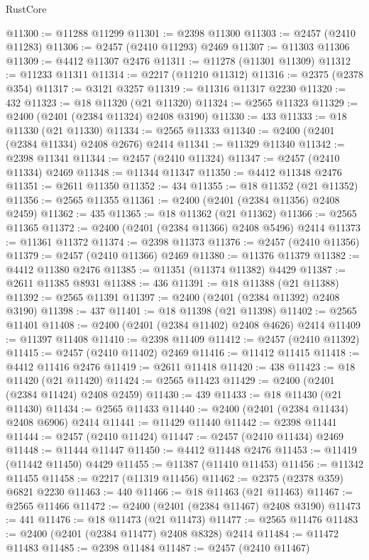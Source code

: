 \begin{lexlean}{RustCore}
\begin{coremodule}
@11300 := @11288 @11299
@11301 := @2398 @11300
@11303 := @2457 (@2410 @11283)
@11306 := @2457 (@2410 @11293) @2469
@11307 := @11303 @11306
@11309 := @4412 @11307 @2476
@11311 := @11278 (@11301 @11309)
@11312 := @11233 @11311
@11314 := @2217 (@11210 @11312)
@11316 := @2375 (@2378 @354)
@11317 := @3121 @3257
@11319 := @11316 @11317 @2230
@11320 := 432
@11323 := @18 @11320 (@21 @11320)
@11324 := @2565 @11323
@11329 := @2400 (@2401 (@2384 @11324) @2408 @3190)
@11330 := 433
@11333 := @18 @11330 (@21 @11330)
@11334 := @2565 @11333
@11340 := @2400 (@2401 (@2384 @11334) @2408 @2676) @2414
@11341 := @11329 @11340
@11342 := @2398 @11341
@11344 := @2457 (@2410 @11324)
@11347 := @2457 (@2410 @11334) @2469
@11348 := @11344 @11347
@11350 := @4412 @11348 @2476
@11351 := @2611 @11350
@11352 := 434
@11355 := @18 @11352 (@21 @11352)
@11356 := @2565 @11355
@11361 := @2400 (@2401 (@2384 @11356) @2408 @2459)
@11362 := 435
@11365 := @18 @11362 (@21 @11362)
@11366 := @2565 @11365
@11372 := @2400 (@2401 (@2384 @11366) @2408 @5496) @2414
@11373 := @11361 @11372
@11374 := @2398 @11373
@11376 := @2457 (@2410 @11356)
@11379 := @2457 (@2410 @11366) @2469
@11380 := @11376 @11379
@11382 := @4412 @11380 @2476
@11385 := @11351 (@11374 @11382) @4429
@11387 := @2611 @11385 @8931
@11388 := 436
@11391 := @18 @11388 (@21 @11388)
@11392 := @2565 @11391
@11397 := @2400 (@2401 (@2384 @11392) @2408 @3190)
@11398 := 437
@11401 := @18 @11398 (@21 @11398)
@11402 := @2565 @11401
@11408 := @2400 (@2401 (@2384 @11402) @2408 @4626) @2414
@11409 := @11397 @11408
@11410 := @2398 @11409
@11412 := @2457 (@2410 @11392)
@11415 := @2457 (@2410 @11402) @2469
@11416 := @11412 @11415
@11418 := @4412 @11416 @2476
@11419 := @2611 @11418
@11420 := 438
@11423 := @18 @11420 (@21 @11420)
@11424 := @2565 @11423
@11429 := @2400 (@2401 (@2384 @11424) @2408 @2459)
@11430 := 439
@11433 := @18 @11430 (@21 @11430)
@11434 := @2565 @11433
@11440 := @2400 (@2401 (@2384 @11434) @2408 @6906) @2414
@11441 := @11429 @11440
@11442 := @2398 @11441
@11444 := @2457 (@2410 @11424)
@11447 := @2457 (@2410 @11434) @2469
@11448 := @11444 @11447
@11450 := @4412 @11448 @2476
@11453 := @11419 (@11442 @11450) @4429
@11455 := @11387 (@11410 @11453)
@11456 := @11342 @11455
@11458 := @2217 (@11319 @11456)
@11462 := @2375 (@2378 @359) @6821 @2230
@11463 := 440
@11466 := @18 @11463 (@21 @11463)
@11467 := @2565 @11466
@11472 := @2400 (@2401 (@2384 @11467) @2408 @3190)
@11473 := 441
@11476 := @18 @11473 (@21 @11473)
@11477 := @2565 @11476
@11483 := @2400 (@2401 (@2384 @11477) @2408 @8328) @2414
@11484 := @11472 @11483
@11485 := @2398 @11484
@11487 := @2457 (@2410 @11467)

\end{coremodule}
\end{lexlean}
